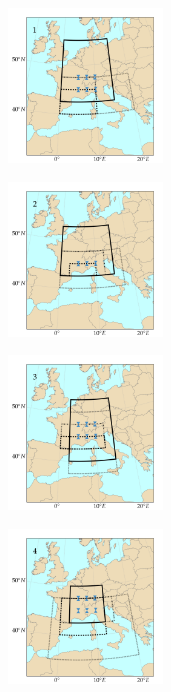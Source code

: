 \documentclass[twocol]{ametsoc}
\begin{document}
\begin{figure}[htb]
	\centering
	\begin{subfigure}{.5\columnwidth}
		\centering
		\includegraphics[width=4.1cm]{figures/spatial_win_z4-hi2/Spatial_windows_1.png}
	\end{subfigure}%
	\begin{subfigure}{.5\columnwidth}
		\centering
		\includegraphics[width=4.1cm]{figures/spatial_win_z4-hi2/Spatial_windows_2.png}
	\end{subfigure}
	\begin{subfigure}{.5\columnwidth}
		\centering
		\includegraphics[width=4.1cm]{figures/spatial_win_z4-hi2/Spatial_windows_3.png}
	\end{subfigure}%
	\begin{subfigure}{.5\columnwidth}
		\centering
		\includegraphics[width=4.1cm]{figures/spatial_win_z4-hi2/Spatial_windows_4.png}

\end{subfigure}
\end{figure}
\end{document}

